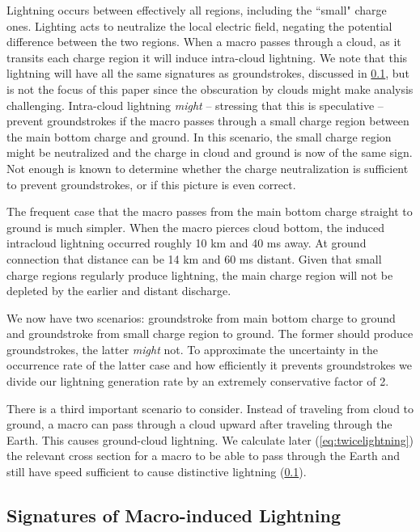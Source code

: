 \documentclass[%
 reprint,
 amsmath,amssymb,
 aps,
]{revtex4-2}
\begin{document}
        Lightning occurs between effectively all regions, including the ``small" charge ones. Lighting acts to neutralize the local electric field, negating the potential difference between the two regions. When a macro passes through a cloud, as it transits each charge region it will induce intra-cloud lightning. We note that this lightning will have all the same signatures as groundstrokes, discussed in \ref{sec:signatures_of_macro_induced_lightning}, but is not the focus of this paper since the obscuration by clouds might make analysis challenging. Intra-cloud lightning \textit{might} -- stressing that this is speculative -- prevent groundstrokes if the macro passes through a small charge region between the main bottom charge and ground. In this scenario, the small charge region might be neutralized and the charge in cloud and ground is now of the same sign. Not enough is known to determine whether the charge neutralization is sufficient to prevent groundstrokes, or if this picture is even correct.
        
        The frequent case that the macro passes from the main bottom charge straight to ground is much simpler. When the macro pierces cloud bottom, the induced intracloud lightning occurred roughly 10 km and 40 ms away. At ground connection that distance can be 14 km and 60 ms distant. Given that small charge regions regularly produce lightning, the main charge region will not be depleted by the earlier and distant discharge.

        We now have two scenarios: groundstroke from main bottom charge to ground and groundstroke from small charge region to ground. The former should produce groundstrokes, the latter \textit{might} not. To approximate the uncertainty in the occurrence rate of the latter case and how efficiently it prevents groundstrokes we divide our lightning generation rate by an extremely conservative factor of 2.
        
        There is a third important scenario to consider. Instead of traveling from cloud to ground, a macro can pass through a cloud upward after traveling through the Earth. This causes ground-cloud lightning. We calculate later (\ref{eq:twicelightning}) the relevant cross section for a macro to be able to pass through the Earth and still have speed sufficient to cause distinctive lightning (\ref{sec:signatures_of_macro_induced_lightning}).


    \subsection{Signatures of Macro-induced Lightning} %
    \label{sec:signatures_of_macro_induced_lightning}
\end{document}
